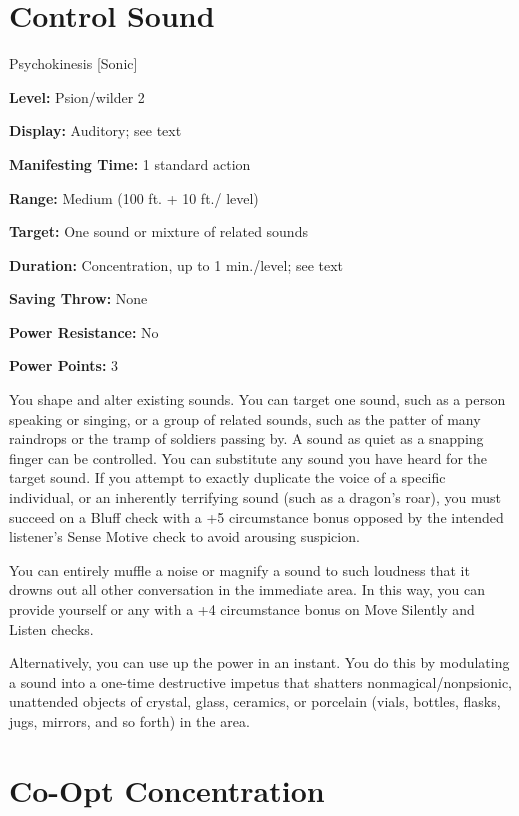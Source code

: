 \documentclass{article}
\begin{document}
\vspace{12pt}
\section*{Control Sound}

Psychokinesis [Sonic]

\textbf{Level:} Psion/wilder 2

\textbf{Display:} Auditory; see text

\textbf{Manifesting Time:} 1 standard action

\textbf{Range:} Medium (100 ft. + 10 ft./ level)

\textbf{Target:} One sound or mixture of related sounds

\textbf{Duration:} Concentration, up to 1 min./level; see text

\textbf{Saving Throw:} None

\textbf{Power Resistance:} No

\textbf{Power Points:} 3

You shape and alter existing sounds. You can target one sound, such as a person 
speaking or singing, or a group of related sounds, such as the patter of many raindrops 
or the tramp of soldiers passing by. A sound as quiet as a snapping finger can 
be controlled. You can substitute any sound you have heard for the target sound. 
If you attempt to exactly duplicate the voice of a specific individual, or an inherently 
terrifying sound (such as a dragon's roar), you must succeed on a Bluff check with 
a +5 circumstance bonus opposed by the intended listener's Sense Motive check to 
avoid arousing suspicion.

You can entirely muffle a noise or magnify a sound to such loudness that it drowns 
out all other conversation in the immediate area. In this way, you can provide 
yourself or any with a +4 circumstance bonus on Move Silently and Listen checks.

Alternatively, you can use up the power in an instant. You do this by modulating 
a sound into a one-time destructive impetus that shatters nonmagical/nonpsionic, 
unattended objects of crystal, glass, ceramics, or porcelain (vials, bottles, flasks, 
jugs, mirrors, and so forth) in the area.

\vspace{12pt}
\section*{Co-Opt Concentration}
\end{document}
